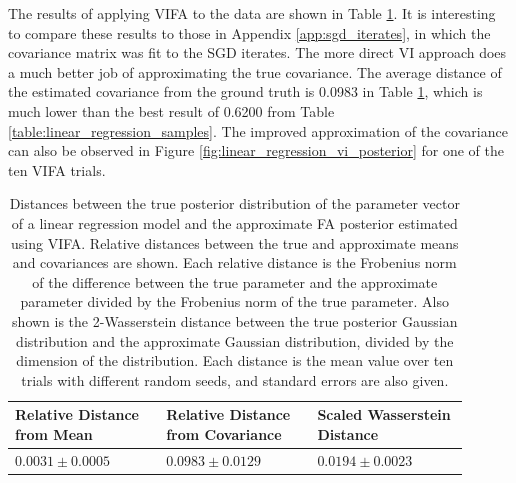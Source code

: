 \documentclass[msc,deptreport.inf]{infthesis} %
\begin{document}
The results of applying VIFA to the data are shown in Table \ref{table:linear_regression_vi_posterior}. It is interesting to compare these results to those in Appendix \ref{app:sgd_iterates}, in which the covariance matrix was fit to the SGD iterates. The more direct VI approach does a much better job of approximating the true covariance. The average distance of the estimated covariance from the ground truth is 0.0983 in Table \ref{table:linear_regression_vi_posterior}, which is much lower than the best result of 0.6200 from Table \ref{table:linear_regression_samples}. The improved approximation of the covariance can also be observed in Figure \ref{fig:linear_regression_vi_posterior} for one of the ten VIFA trials. 

\begin{table}[h!]
	\begin{center}
		\begin{tabular}{|| p{0.3\linewidth} p{0.3\linewidth} p{0.3\linewidth} ||} 
 			\hline
 			Relative Distance from Mean & Relative Distance from Covariance & Scaled Wasserstein Distance \\ [0.5ex] 
 			\hline\hline
			$0.0031 \pm 0.0005$ 	& $0.0983 \pm 0.0129$ 	& $0.0194 \pm 0.0023$ \\ [1ex] 
			\hline
		\end{tabular}
		\caption{Distances between the true posterior distribution of the parameter vector of a linear regression model and the approximate FA posterior estimated using VIFA. Relative distances between the true and approximate means and covariances are shown. Each relative distance is the Frobenius norm of the difference between the true parameter and the approximate parameter divided by the Frobenius norm of the true parameter. Also shown is the 2-Wasserstein distance between the true posterior Gaussian distribution and the approximate Gaussian distribution, divided by the dimension of the distribution. Each distance is the mean value over ten trials with different random seeds, and standard errors are also given.}
		\label{table:linear_regression_vi_posterior}
	\end{center}
\end{table}
\end{document}
